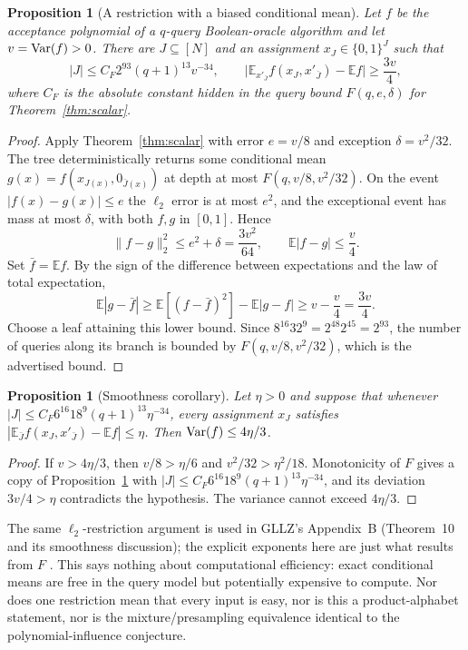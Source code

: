 \documentclass[11pt]{article}
\newtheorem{proposition}[theorem]{Proposition}
\theoremstyle{definition}\newtheorem{definition}[theorem]{Definition}
\theoremstyle{remark}\newtheorem{remark}[theorem]{Remark}
\newcommand{\E}{\mathbb E}\newcommand{\Prb}{\mathbb P}
\begin{document}
\begin{proposition}[A restriction with a biased conditional mean]\label{prop:restriction}
Let \(f\) be the acceptance polynomial of a \(q\)-query Boolean-oracle algorithm and let \(v=\operatorname{Var}(f)>0\). There are \(J\subseteq[N]\) and an assignment \(x_J\in\{0,1\}^J\) such that
\[
 |J|\le C_F2^{93}(q+1)^{13}v^{-34},\qquad
 \bigl|\E_{x'_{\bar J}}f(x_J,x'_{\bar J})-\E f\bigr|\ge\frac{3v}4,
\]
where \(C_F\) is the absolute constant hidden in the query bound \(F(q,e,\delta)\) for Theorem~\ref{thm:scalar}.
\end{proposition}
\begin{proof}
Apply Theorem~\ref{thm:scalar} with error \(e=v/8\) and exception \(\delta=v^2/32\). The tree deterministically returns some conditional mean \(g(x)=f(x_{J(x)},0_{\bar J(x)})\) at depth at most \(F(q,v/8,v^2/32)\). On the event \(|f(x)-g(x)|\le e\) the \(\ell_2\) error is at most \(e^2\), and the exceptional event has mass at most \(\delta\), with both \(f,g\) in \([0,1]\). Hence
\[
 \|f-g\|_2^2\le e^2+\delta=\frac{3v^2}{64},\qquad \E|f-g|\le\frac v4.
\]
Set \(\bar f=\E f\). By the sign of the difference between expectations and the law of total expectation,
\[
 \E|g-\bar f|\ge\E[(f-\bar f)^2]-\E|g-f|\ge v-\frac v4=\frac{3v}4.
\]
Choose a leaf attaining this lower bound. Since \(8^{16}32^9=2^{48}2^{45}=2^{93}\), the number of queries along its branch is bounded by \(F(q,v/8,v^2/32)\), which is the advertised bound.
\end{proof}

\begin{proposition}[Smoothness corollary]
Let \(\eta>0\) and suppose that whenever \(|J|\le C_F6^{16}18^9(q+1)^{13}\eta^{-34}\), every assignment \(x_J\) satisfies \(|\E_{\bar J}f(x_J,x'_{\bar J})-\E f|\le\eta\). Then \(\operatorname{Var}(f)\le4\eta/3\).
\end{proposition}
\begin{proof}
If \(v>4\eta/3\), then \(v/8>\eta/6\) and \(v^2/32>\eta^2/18\). Monotonicity of \(F\) gives a copy of Proposition~\ref{prop:restriction} with \(|J|\le C_F6^{16}18^9(q+1)^{13}\eta^{-34}\), and its deviation \(3v/4>\eta\) contradicts the hypothesis. The variance cannot exceed \(4\eta/3\).
\end{proof}

The same \(\ell_2\)-restriction argument is used in GLLZ's Appendix~B (Theorem~10 and its smoothness discussion); the explicit exponents here are just what results from \(F\) \cite{GLLZ21}. This says nothing about computational efficiency: exact conditional means are free in the query model but potentially expensive to compute. Nor does one restriction mean that every input is easy, nor is this a product-alphabet statement, nor is the mixture/presampling equivalence identical to the polynomial-influence conjecture.
\end{document}
